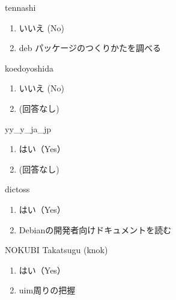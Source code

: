 \begin{prework}{ tennashi }
  \begin{enumerate}
  \item いいえ (No)
  \item deb パッケージのつくりかたを調べる
  \end{enumerate}
\end{prework}

\begin{prework}{ koedoyoshida }
  \begin{enumerate}
  \item いいえ (No)
  \item (回答なし)
  \end{enumerate}
\end{prework}

\begin{prework}{ yy\_y\_ja\_jp }
  \begin{enumerate}
  \item はい（Yes）
  \item (回答なし)
  \end{enumerate}
\end{prework}

\begin{prework}{ dictoss }
  \begin{enumerate}
  \item はい（Yes）
  \item Debianの開発者向けドキュメントを読む
  \end{enumerate}
\end{prework}

\begin{prework}{ NOKUBI Takatsugu (knok) }
  \begin{enumerate}
  \item はい（Yes）
  \item uim周りの把握
  \end{enumerate}
\end{prework}
